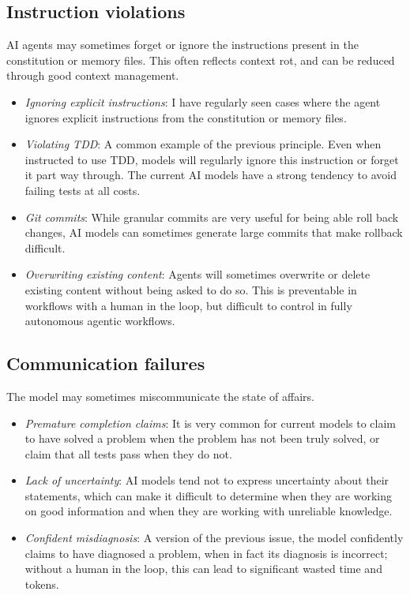 \subsection{Instruction violations}

AI agents may sometimes forget or ignore the instructions present in the constitution or memory files.  This often reflects context rot, and can be reduced through good context management.

\begin{itemize}
\item \textit{Ignoring explicit instructions}: I have regularly seen cases where the agent ignores explicit instructions from the constitution or memory files.
\item \textit{Violating TDD}: A common example of the previous principle. Even when instructed to use TDD, models will regularly ignore this instruction or forget it part way through.  The current AI models have a strong tendency to avoid failing tests at all costs.
\item \textit{Git commits}: While granular commits are very useful for being able roll back changes, AI models can sometimes generate large commits that make rollback difficult.
\item \textit{Overwriting existing content}: Agents will sometimes overwrite or delete existing content without being asked to do so.  This is preventable in workflows with a human in the loop, but difficult to control in fully autonomous agentic workflows.
\end{itemize}

\subsection{Communication failures}

The model may sometimes miscommunicate the state of affairs.

\begin{itemize}
\item \textit{Premature completion claims}: It is very common for current models to claim to have solved a problem when the problem has not been truly solved, or claim that all tests pass when they do not.
\item \textit{Lack of uncertainty}: AI models tend not to express uncertainty about their statements, which can make it difficult to determine when they are working on good information and when they are working with unreliable knowledge.
\item \textit{Confident misdiagnosis}: A version of the previous issue, the model confidently claims to have diagnosed a problem, when in fact its diagnosis is incorrect; without a human in the loop, this can lead to significant wasted time and tokens.
\end{itemize}

